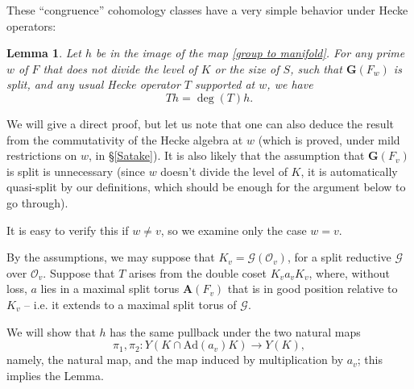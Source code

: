 \documentclass[10pt]{amsart}
\newcommand{\Ad}{\mathrm{Ad}}
\newtheorem{lemma}[subsection]{Lemma}
\theoremstyle{remark}
\begin{document}

 
 These ``congruence'' cohomology classes have a very simple behavior under Hecke operators:   \begin{lemma} \label{lem:HTriv}
 Let $h$ be in the image of the map \eqref{group to manifold}. 
For any prime $w$ of $F$ that does not divide the level of $K$ or the size of $S$, such that $\mathbf{G}(F_w)$ is split, and any usual Hecke operator 
$T$ supported at $w$, we have
 $$T h= \deg(T) h.$$
 \end{lemma}
 We will give a direct proof, but let us note that one can also deduce the result
from the commutativity of the Hecke algebra at $w$ (which is proved, under mild restrictions on $w$, in 
\S \ref{Satake}).   It is also likely that the assumption that $\mathbf{G}(F_v)$ is split is unnecessary (since $w$ doesn't divide the level of $K$, it is automatically quasi-split by our definitions, which should be enough
for the argument below to go through). 
 
 \proof
It is easy to verify this if $w \neq v$, so we examine only the case $w=v$. 



By the assumptions, we may suppose that $K_v = \mathcal{G}(\mathcal{O}_v)$, for a split reductive $\mathcal{G}$ over $\mathcal{O}_v$. 
 Suppose that $T$ arises from the double coset $K_v a_v K_v$, where, without loss,
$a$ lies in a maximal split torus $\mathbf{A}(F_v)$ that is in good position relative to $K_v$ -- i.e.
it extends to a maximal split torus of    $\mathcal{G}$.   

We will show that  $h$ has the same pullback under the two natural maps
$$\pi_1, \pi_2: Y(K \cap \Ad(a_v) K) \rightarrow Y(K),$$
namely, the natural map, and the map induced by multiplication by $a_v$; this implies the Lemma.
\end{document}
